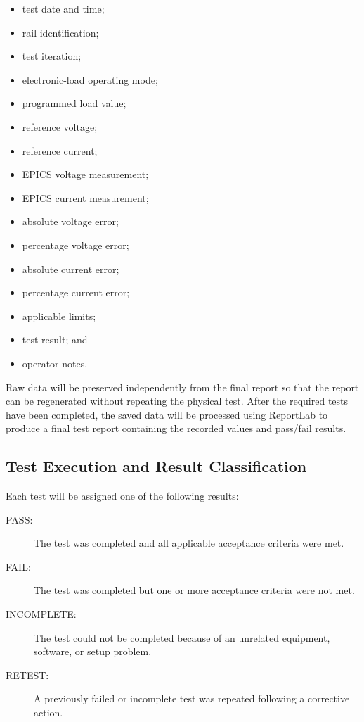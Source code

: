 \begin{itemize}
    \item test date and time;
    \item rail identification;
    \item test iteration;
    \item electronic-load operating mode;
    \item programmed load value;
    \item reference voltage;
    \item reference current;
    \item EPICS voltage measurement;
    \item EPICS current measurement;
    \item absolute voltage error;
    \item percentage voltage error;
    \item absolute current error;
    \item percentage current error;
    \item applicable limits;
    \item test result; and
    \item operator notes.
\end{itemize}

Raw data will be preserved independently from the final report so that the report
can be regenerated without repeating the physical test. After the required tests
have been completed, the saved data will be processed using ReportLab to produce
a final test report containing the recorded values and pass/fail results.

\subsection{Test Execution and Result Classification}

Each test will be assigned one of the following results:

\begin{description}
    \item[PASS:] The test was completed and all applicable acceptance criteria were met.
    \item[FAIL:] The test was completed but one or more acceptance criteria were not met.
    \item[INCOMPLETE:] The test could not be completed because of an unrelated equipment,
    software, or setup problem.
    \item[RETEST:] A previously failed or incomplete test was repeated following a
    corrective action.
\end{description}

